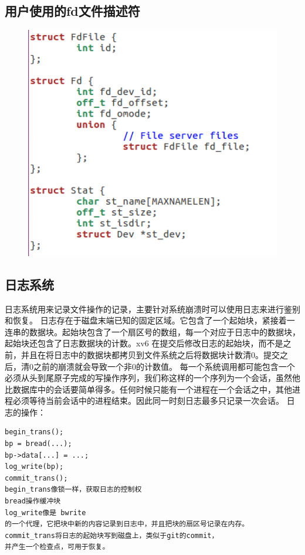 \documentclass[a4paper,12pt]{report}
\begin{document}
\subsection{	用户使用的fd文件描述符}
\begin{figure}[H]
	\centering
	\includegraphics [width=1.0\textwidth]{figure//image155.png}
\end{figure}



\subsection{		日志系统}


日志系统用来记录文件操作的记录，主要针对系统崩溃时可以使用日志来进行鉴别和恢复。
日志存在于磁盘末端已知的固定区域。它包含了一个起始块，紧接着一连串的数据块。起始块包含了一个扇区号的数组，每一个对应于日志中的数据块，起始块还包含了日志数据块的计数。xv6 在提交后修改日志的起始块，而不是之前，并且在将日志中的数据块都拷贝到文件系统之后将数据块计数清0。提交之后，清0之前的崩溃就会导致一个非0的计数值。
每一个系统调用都可能包含一个必须从头到尾原子完成的写操作序列，我们称这样的一个序列为一个会话，虽然他比数据库中的会话要简单得多。任何时候只能有一个进程在一个会话之中，其他进程必须等待当前会话中的进程结束。因此同一时刻日志最多只记录一次会话。
日志的操作：
\begin{lstlisting}
begin_trans();
bp = bread(...);
bp->data[...] = ...;
log_write(bp);
commit_trans();
begin_trans像锁一样，获取日志的控制权
bread操作缓冲块
log_write像是 bwrite
的一个代理，它把块中新的内容记录到日志中，并且把块的扇区号记录在内存。
commit_trans将日志的起始块写到磁盘上，类似于git的commit，
并产生一个检查点，可用于恢复。
\end{lstlisting}
\end{document}
